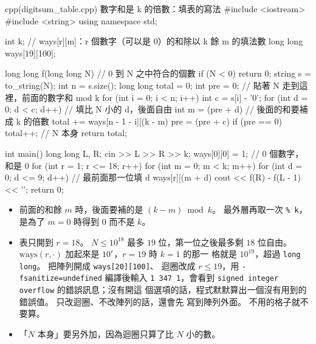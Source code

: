 \begin{example}[label=ex:dg-digitsum-table]{cpp}{(digitsum\_table.cpp) 數字和是 k 的倍數：填表的寫法}
#include <iostream>
#include <string>
using namespace std;

int k;
// ways[r][m]：r 個數字（可以是 0）的和除以 k 餘 m 的填法數
long long ways[19][100];

long long f(long long N) {   // 0 到 N 之中符合的個數
    if (N < 0) {
        return 0;
    }
    string s = to_string(N);
    int n = s.size();
    long long total = 0;
    int pre = 0;             // 貼著 N 走到這裡，前面的數字和 mod k
    for (int i = 0; i < n; i++) {
        int c = s[i] - '0';
        for (int d = 0; d < c; d++) {   // 填比 N 小的 d，後面自由
            int m = (pre + d) %
            // 後面的和要補成 k 的倍數
            total += ways[n - 1 - i][(k - m) %
        }
        pre = (pre + c) %
    }
    if (pre == 0) {
        total++;             // N 本身
    }
    return total;
}

int main() {
    long long L, R;
    cin >> L >> R >> k;
    ways[0][0] = 1;          // 0 個數字，和是 0
    for (int r = 1; r <= 18; r++) {
        for (int m = 0; m < k; m++) {
            for (int d = 0; d <= 9; d++) {   // 最前面那一位填 d
                ways[r][(m + d) %
            }
        }
    }
    cout << f(R) - f(L - 1) << '\n';
    return 0;
}
\end{example}


\begin{itemize}
\item 前面的和餘 $m$ 時，後面要補的是 $(k - m) \bmod k$。 最外層再取一次
\texttt{\% k}，是為了 $m = 0$ 時得到 $0$ 而不是 $k$。
\item 表只開到 $r = 18$。 $N \le 10^{18}$ 最多 $19$ 位，第一位之後最多剩 $18$
位自由。 $\mathrm{ways}(r, \cdot)$ 加起來是 $10^r$，$r = 19$ 時 $k = 1$ 的那一
格就是 $10^{19}$，超過 \texttt{long long}。 把陣列開成 \texttt{ways[20][100]}、
迴圈改成 $r \le 19$，用 \texttt{-fsanitize=undefined} 編譯後輸入
\texttt{1 347 1}，會看到 \texttt{signed integer overflow} 的錯誤訊息；沒有開這
個選項的話，程式默默算出一個沒有用到的錯誤值。 只改迴圈、不改陣列的話，還會先
寫到陣列外面。 不用的格子就不要算。
\item 「$N$ 本身」要另外加，因為迴圈只算了比 $N$ 小的數。
\end{itemize}

